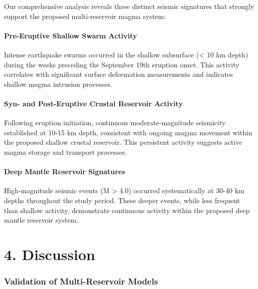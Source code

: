 \documentclass[
  letterpaper,
]{article}
\begin{document}
Our comprehensive analysis reveals three distinct seismic signatures
that strongly support the proposed multi-reservoir magma system:

\subsubsection{Pre-Eruptive Shallow Swarm
Activity}\label{pre-eruptive-shallow-swarm-activity}

Intense earthquake swarms occurred in the shallow subsurface
(\textless{} 10 km depth) during the weeks preceding the September 19th
eruption onset. This activity correlates with significant surface
deformation measurements and indicates shallow magma intrusion
processes.

\subsubsection{Syn- and Post-Eruptive Crustal Reservoir
Activity}\label{syn--and-post-eruptive-crustal-reservoir-activity}

Following eruption initiation, continuous moderate-magnitude seismicity
established at 10-15 km depth, consistent with ongoing magma movement
within the proposed shallow crustal reservoir. This persistent activity
suggests active magma storage and transport processes.

\subsubsection{Deep Mantle Reservoir
Signatures}\label{deep-mantle-reservoir-signatures}

High-magnitude seismic events (M \textgreater{} 4.0) occurred
systematically at 30-40 km depths throughout the study period. These
deeper events, while less frequent than shallow activity, demonstrate
continuous activity within the proposed deep mantle reservoir system.


\chapter{4. Discussion}\label{discussion}

\subsection{Validation of Multi-Reservoir
Models}\label{validation-of-multi-reservoir-models}
\end{document}
